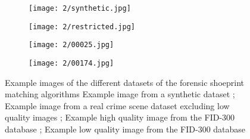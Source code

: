 \documentclass[draft,final]{vutinfth} %
\begin{document}
\begin{figure}[h]
  \centering
  \begin{subfigure}[t]{0.24\columnwidth}
    \centering
    \texttt{[image: 2/synthetic.jpg]}
    \subcaption{}
    \label{fig:rw:synthetic}
  \end{subfigure}
  \begin{subfigure}[t]{0.24\columnwidth}
    \centering
    \texttt{[image: 2/restricted.jpg]}
    \subcaption{}
    \label{fig:rw:restricted}
  \end{subfigure}
  \begin{subfigure}[t]{0.24\columnwidth}
    \centering
    \texttt{[image: 2/00025.jpg]}
    \subcaption{}
    \label{fig:rw:highFID}
  \end{subfigure}
  \begin{subfigure}[t]{0.24\columnwidth}
    \centering
    \texttt{[image: 2/00174.jpg]}
    \subcaption{}
    \label{fig:rw:lowFID}
  \end{subfigure}
  \caption{Example images of the different datasets of the forensic shoeprint matching algorithms
	 Example image from a synthetic dataset \cite{alizadeh2017automatic};  Example image from a real crime scene dataset excluding low quality images \cite{li2014retrieval};  Example high quality image from the FID-300 database \cite{kortylewski2014unsupervised};  Example low quality image from the FID-300 database \cite{kortylewski2014unsupervised}}
  \label{fig:rw:database}
\end{figure}
\end{document}
